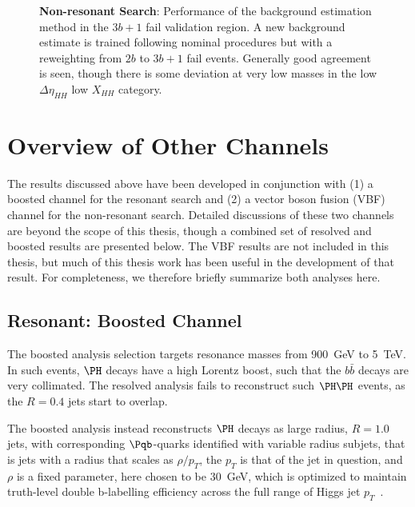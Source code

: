 \begin{figure}[ht]
  \centering
  \hspace*{-2cm}
  \caption{\label{fig:nonres-sr-mhh-3b1f} \textbf{Non-resonant Search}: Performance of the background estimation 
  method in the $3b+1$ fail validation region. A new background estimate is trained following nominal procedures 
  but with a reweighting from $2b$ to $3b+1$ fail events. Generally good agreement is seen, though there is some 
  deviation at very low masses in the low $\Delta\eta_{HH}$ low $X_{HH}$ category.}
\end{figure}


\FloatBarrier
\clearpage
\section{Overview of Other \bbbb Channels}
The results discussed above have been developed in conjunction with (1) a boosted channel 
for the resonant search and (2) a vector boson fusion (VBF) channel for the non-resonant search. 
Detailed discussions of these two channels are beyond the scope of this thesis, though a 
combined set of resolved and boosted results are presented below. The VBF results are 
not included in this thesis, but much of this thesis work has been useful in the development 
of that result. For completeness, we therefore briefly summarize both analyses here.

\subsection{Resonant: Boosted Channel}
The boosted analysis selection targets resonance masses from \SI{900}{\GeV} to \SI{5}{\TeV}.
In such events, $\higgs$ decays have a high Lorentz boost, such that the $b\bar{b}$ decays are
very collimated. The resolved analysis fails to reconstruct such $\higgs\higgs$ events, as the 
$R=0.4$ jets start to overlap. 

The boosted analysis instead reconstructs $\higgs$ decays as large radius, $R=1.0$ jets, with 
corresponding $\Pqb$-quarks identified with variable radius subjets, that is jets with a 
radius that scales as $\rho / p_{T}$, the $p_{T}$ is that of the jet in question, and
$\rho$ is a fixed parameter, here chosen to be \SI{30}{\GeV}, which is optimized to maintain 
truth-level double b-labelling efficiency across the full range of Higgs jet $p_{T}$~\cite{ATL-PHYS-PUB-2017-010}.

